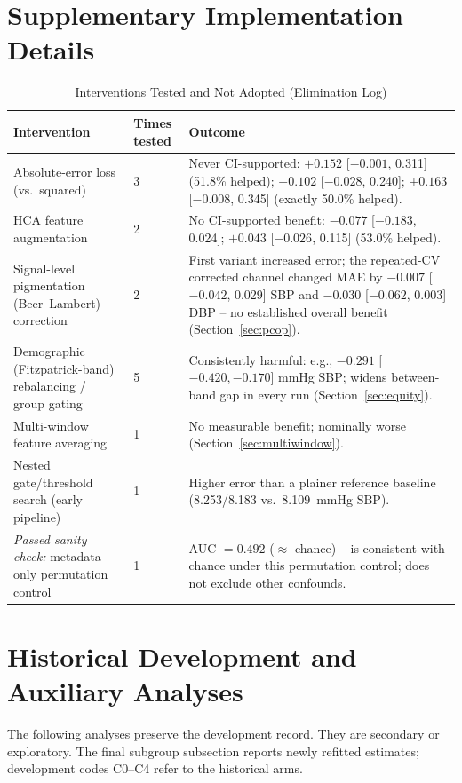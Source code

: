 \documentclass[12pt]{article}
\begin{document}
\ifdefined\INCLUDECOMBINEDSUPPLEMENT
\clearpage
\normalfont\normalsize
\appendices
\section{Supplementary Implementation Details}
\label{app:implementation}
\setcounter{table}{0}
\setcounter{figure}{0}

\begin{table}[t]
\centering
\caption{Interventions Tested and Not Adopted (Elimination Log)}
\label{tab:whatdidnotwork}
\begin{tabular}{p{4.6cm}p{2.4cm}p{7.8cm}}
\toprule
Intervention & Times tested & Outcome \\
\midrule
Absolute-error loss (vs.\ squared) & 3 & Never CI-supported: $+0.152$ [$-0.001$, 0.311] (51.8\% helped); $+0.102$ [$-0.028$, 0.240]; $+0.163$ [$-0.008$, 0.345] (exactly 50.0\% helped). \\
HCA feature augmentation & 2 & No CI-supported benefit: $-0.077$ [$-0.183$, 0.024]; $+0.043$ [$-0.026$, 0.115] (53.0\% helped). \\
Signal-level pigmentation (Beer--Lambert) correction & 2 & First variant increased error; the repeated-CV corrected channel changed MAE by $-0.007$ [$-0.042$, 0.029] SBP and $-0.030$ [$-0.062$, 0.003] DBP -- no established overall benefit (Section~\ref{sec:pcop}). \\
Demographic (Fitzpatrick-band) rebalancing / group gating & 5 & Consistently harmful: e.g., $-0.291$ [$-0.420,-0.170]$ mmHg SBP; widens between-band gap in every run (Section~\ref{sec:equity}). \\
Multi-window feature averaging & 1 & No measurable benefit; nominally worse (Section~\ref{sec:multiwindow}). \\
Nested gate/threshold search (early pipeline) & 1 & Higher error than a plainer reference baseline (8.253/8.183 vs.\ 8.109~mmHg SBP). \\
\midrule
\emph{Passed sanity check:} metadata-only permutation control & 1 & AUC $=0.492$ ($\approx$ chance) -- is consistent with chance under this permutation control; does not exclude other confounds. \\
\bottomrule
\end{tabular}
\end{table}
\section{Historical Development and Auxiliary Analyses}
The following analyses preserve the development record. They are secondary or exploratory. The final subgroup subsection reports newly refitted estimates; development codes C0--C4 refer to the historical arms.
\end{document}
